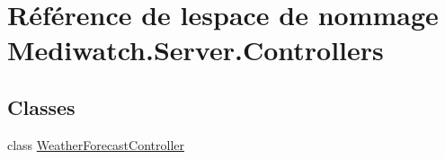 \hypertarget{namespace_mediwatch_1_1_server_1_1_controllers}{}\section{Référence de l\textquotesingle{}espace de nommage Mediwatch.\+Server.\+Controllers}
\label{namespace_mediwatch_1_1_server_1_1_controllers}
\subsection*{Classes}
\begin{DoxyCompactItemize}
\item 
class \hyperlink{class_mediwatch_1_1_server_1_1_controllers_1_1_weather_forecast_controller}{Weather\+Forecast\+Controller}
\end{DoxyCompactItemize}
